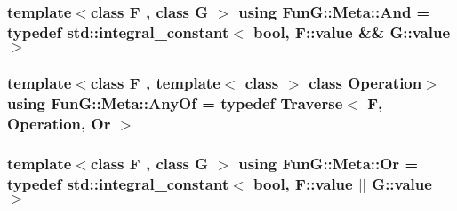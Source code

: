 \subsubsection[{\texorpdfstring{And}{And}}]{\setlength{\rightskip}{0pt plus 5cm}template$<$class F , class G $>$ using {\bf Fun\+G\+::\+Meta\+::\+And} = typedef std\+::integral\+\_\+constant$<$ bool, F\+::value \&\& G\+::value $>$}\hypertarget{namespaceFunG_1_1Meta_a6f0fce21e31ab8fdc307eddead3b8d66}{}\label{namespaceFunG_1_1Meta_a6f0fce21e31ab8fdc307eddead3b8d66}
\subsubsection[{\texorpdfstring{Any\+Of}{AnyOf}}]{\setlength{\rightskip}{0pt plus 5cm}template$<$class F , template$<$ class $>$ class Operation$>$ using {\bf Fun\+G\+::\+Meta\+::\+Any\+Of} = typedef {\bf Traverse}$<$ F, Operation, {\bf Or} $>$}\hypertarget{namespaceFunG_1_1Meta_a54a94493bb1caa42606dd7e6744abf8c}{}\label{namespaceFunG_1_1Meta_a54a94493bb1caa42606dd7e6744abf8c}
\subsubsection[{\texorpdfstring{Or}{Or}}]{\setlength{\rightskip}{0pt plus 5cm}template$<$class F , class G $>$ using {\bf Fun\+G\+::\+Meta\+::\+Or} = typedef std\+::integral\+\_\+constant$<$ bool, F\+::value $\vert$$\vert$ G\+::value $>$}\hypertarget{namespaceFunG_1_1Meta_a54cebc5541fa7677e239a9b7a84aba7e}{}\label{namespaceFunG_1_1Meta_a54cebc5541fa7677e239a9b7a84aba7e}
